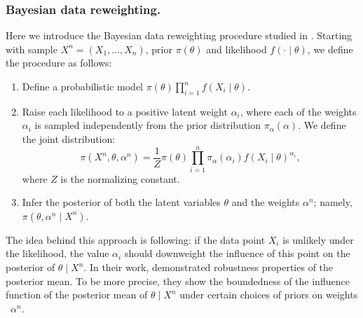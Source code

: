 \documentclass[11pt, oneside]{amsart}
\theoremstyle{definition}   %
\begin{document}
\subsubsection{Bayesian data reweighting.}
\label{subsection::Bayesian-Data-Reweighting}
Here we introduce the Bayesian data reweighting procedure studied in \cite{wang:kucukelbir:blei2017}. 
%
Starting with sample \(X^n = (X_1, \ldots, X_n)\), prior \( \pi(\theta)\) and likelihood \( f(\cdot \mid \theta)\), we define the procedure as follows:
%
\begin{enumerate}
    \item Define a probabilistic model \( \pi(\theta) \prod_{i=1}^n f(X_i \mid \theta)\).
    \item Raise each likelihood to a positive latent weight \( \alpha_i\), where each of the weights \( \alpha_i \) is sampled independently from the prior distribution  \( \pi_\alpha(\alpha)\). 
    We define the joint distribution:
    \[
        \pi(X^n, \theta, \alpha^n) = \frac{1}{Z} \pi(\theta) \prod_{i=1}^n \pi_\alpha (\alpha_i) f(X_i \mid \theta) ^ {\alpha_i},
    \]
    where \( Z \) is the normalizing constant.
    \item Infer the posterior of both the latent variables \(\theta\) and the weights \( \alpha^n\); namely, \( \pi(\theta, \alpha^n \mid X^n). \)
\end{enumerate}

%
The idea behind this approach is following: if the data point \( X_i\) is unlikely under the likelihood, the value \( \alpha_i\) should downweight the influence of this point on the posterior of \( \theta \mid X^n\). 
%
In their work, \cite{wang:kucukelbir:blei2017} demonstrated robustness properties of the posterior mean. To be more precise, they show the boundedness of the influence function of the posterior mean of $\theta\mid X^n$ under certain choices of priors on weights ~\( \alpha^n \).
\end{document}
